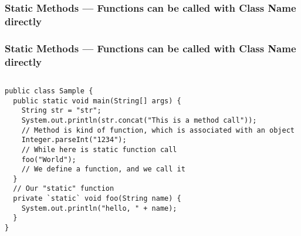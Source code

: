 \documentclass[en, 11pt, xcolor=dvipsnames]{beamer}
\begin{document}
\subsubsection{Static Methods --- Functions can be called with Class Name directly}
\begin{frame}[fragile]
	\frametitle{Static Methods --- Functions can be called with Class Name directly}



	\begin{columns}[c]
		\begin{column}{0.9\textwidth}

			\begin{lstlisting}[style=Java]
public class Sample {
  public static void main(String[] args) {
    String str = "str";
    System.out.println(str.concat("This is a method call"));
    // Method is kind of function, which is associated with an object
    Integer.parseInt("1234");
    // While here is static function call
    foo("World");
    // We define a function, and we call it
  }
  // Our "static" function
  private `static` void foo(String name) {
    System.out.println("hello, " + name);
  }
}
\end{lstlisting}

		\end{column}
	\end{columns}

\end{frame}
\end{document}

